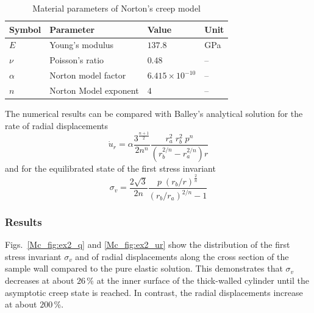 \begin{table}[!htb]
\centering
\caption{Material parameters of Norton's creep model}
\label{Mc_tab:creep_norton}
\begin{tabular}{llll}
\toprule
Symbol & Parameter & Value & Unit \\
\midrule
$E$      & Young's modulus       & $137.8$                & GPa \\
$\nu$    & Poisson's ratio       & $0.48$                 & -- \\
$\alpha$ & Norton model factor   & $6.415\times 10^{-10}$ & -- \\
$n$      & Norton Model exponent & $4$                    & -- \\
\bottomrule
\end{tabular}
\end{table}

The numerical results can be compared with Balley's analytical solution for the rate of radial displacements
%
\[
  \dot u_{r} =\alpha \dfrac{3^{\frac{n+1}{2}}}{2n^n}\dfrac{r_{a}^2\;r_{b}^2\;p^n}{(r_{b}^{2/n}-r_{a}^{2/n})r}
\]
and for the equilibrated state of the first stress invariant
\[
  \sigma_v =\dfrac{2\sqrt 3}{2n} \dfrac{p\;\left(r_b/r\right)^{\frac{2}{n}}}{(r_{b}/r_a)^{2/n}-1}
\]

\subsubsection{Results}
\label{subsubsec:Mc1_res}

Figs.~\ref{Mc_fig:ex2_q} and \ref{Mc_fig:ex2_ur} show the distribution of the first stress invariant $\sigma_v$ and of radial displacements along the cross section of the sample wall compared to the pure elastic solution. This demonstrates that $\sigma_v$ decreases at about $26\,$\% at the inner surface of the thick-walled cylinder until the asymptotic creep state is reached. In contrast, the radial displacements increase at about $200\,$\%.

